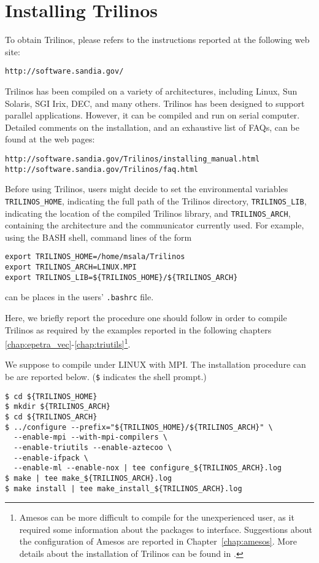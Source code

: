 
\section{Installing Trilinos}
\label{sec:installing}

To obtain Trilinos, please refers to the instructions reported at the
following web site:
\begin{verbatim}
http://software.sandia.gov/
\end{verbatim}

Trilinos has been compiled on a variety of architectures, including
Linux, Sun Solaris, SGI Irix, DEC, and many others. Trilinos has been
designed to support parallel applications. However, it can be compiled
and run on serial computer.  Detailed comments on the installation, and
an exhaustive list of FAQs, can be found at the web pages:
\begin{verbatim}
http://software.sandia.gov/Trilinos/installing_manual.html
http://software.sandia.gov/Trilinos/faq.html
\end{verbatim}


Before using Trilinos, users might decide to set the environmental
variables \verb!TRILINOS_HOME!, indicating the full path of the Trilinos
directory, \verb!TRILINOS_LIB!, indicating the location of the compiled
Trilinos library, and \verb!TRILINOS_ARCH!, containing the architecture
and the communicator currently used.  For example, using the BASH shell,
command lines of the form
\begin{verbatim}
export TRILINOS_HOME=/home/msala/Trilinos
export TRILINOS_ARCH=LINUX.MPI
export TRILINOS_LIB=${TRILINOS_HOME}/${TRILINOS_ARCH}
\end{verbatim}
can be places in the users' \verb!.bashrc! file.

\smallskip

Here, we briefly report the procedure one should follow in order to
compile Trilinos as required by the examples reported in the following
chapters \ref{chap:epetra_vec}-\ref{chap:triutils}\footnote{Amesos can
  be more difficult to compile for the unexperienced user, as it
  required some information about the packages to interface. Suggestions
  about the configuration of Amesos are reported in
  Chapter~\ref{chap:amesos}. More details about the installation of
  Trilinos can be found in \cite{Trilinos-Users-Guide}.}.

We suppose to compile under LINUX with MPI. The installation procedure
can be are reported below. (\verb!$! indicates the shell prompt.)
\begin{verbatim}
$ cd ${TRILINOS_HOME}
$ mkdir ${TRILINOS_ARCH}
$ cd ${TRILINOS_ARCH}
$ ../configure --prefix="${TRILINOS_HOME}/${TRILINOS_ARCH}" \
  --enable-mpi --with-mpi-compilers \
  --enable-triutils --enable-aztecoo \
  --enable-ifpack \
  --enable-ml --enable-nox | tee configure_${TRILINOS_ARCH}.log
$ make | tee make_${TRILINOS_ARCH}.log
$ make install | tee make_install_${TRILINOS_ARCH}.log
\end{verbatim}


